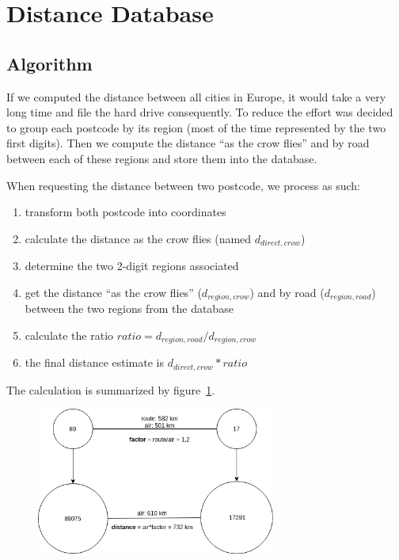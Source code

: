 
\section{Distance Database}

\subsection{Algorithm}

If we computed the distance between all cities in Europe, it would take a very
long time and file the hard drive consequently.
To reduce the effort was decided to group each postcode by its region (most of the
time represented by the two first digits). Then we compute the distance ``as the
crow flies'' and by road between each of these regions and store them into the database.

When requesting the distance between two postcode, we process as such:
\begin{enumerate}
  \item transform both postcode into coordinates
  \item calculate the distance as the crow flies (named $d_{direct,crow}$)
  \item determine the two 2-digit regions associated
  \item get the distance ``as the crow flies'' ($d_{region,crow}$) and by road
      ($d_{region,road}$) between the two regions from the database
  \item calculate the ratio $ratio = d_{region,road}/d_{region,crow}$
  \item the final distance estimate is $d_{direct,crow} * ratio$
\end{enumerate}

The calculation is summarized by figure~\ref{fig:calc}.
\begin{figure}[H]
\centering
\includegraphics[width=0.7\textwidth]{img/calc}
\label{fig:calc}
\end{figure}

